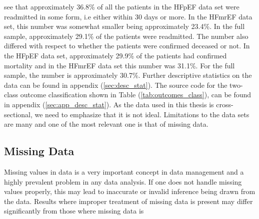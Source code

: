\documentclass[../thesis.tex]{subfiles}
\begin{document}
\vspace*{-0,5cm}\noindent see that approximately 36.8\% of all the patients in the HFpEF data set were readmitted in some form, i.e either within 30 days or more. In the HFmrEF data set, this number was somewhat smaller being approximately 23.4\%. In the full sample, approximately 29.1\% of the patients were readmitted. The number also differed with respect to whether the patients were confirmed deceased or not. In the HFpEF data set, approximately 29.9\% of the patients had confirmed mortality and in the HFmrEF data set this number was 31.1\%. For the full sample, the number is approximately 30.7\%. Further descriptive statistics on the data can be found in appendix (\ref{sec:desc_stat}). The source code for the two-class outcome classification shown in Table (\ref{tab:outcomes_class}), can be found in appendix (\ref{sec:app_desc_stat}). As the data used in this thesis is cross-sectional, we need to emphasize that it is not ideal. Limitations to the data sets are many and one of the most relevant one is that of missing data. 

\subsection{Missing Data}
\label{subsec:miss_data}

\noindent Missing values in data is a very important concept in data management and a highly prevalent problem in any data analysis. If one does not handle missing values properly, this may lead to inaccurate or invalid inference being drawn from the data. Results where improper treatment of missing data is present may differ significantly from those where missing data is  


\end{document}
